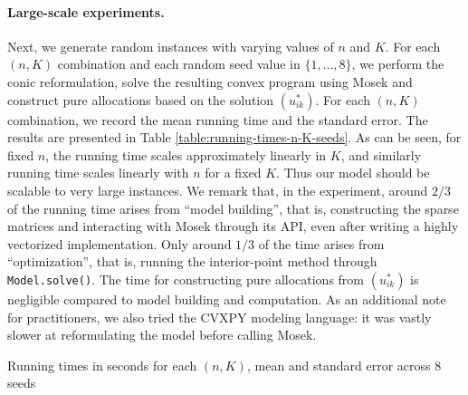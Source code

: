 \paragraph{Large-scale experiments.} 
Next, we generate random instances with varying values of $n$ and $K$.
For each $(n,K)$ combination and each random seed value in $\{ 1, \dots, 8\}$, we perform the conic reformulation, solve the resulting convex program using Mosek and construct pure allocations based on the solution $(u^*_{ik})$.
For each $(n,K)$ combination, we record the mean running time and the standard error.
The results are presented in Table \ref{table:running-times-n-K-seeds}. 
As can be seen, for fixed $n$, the running time scales approximately linearly in $K$, and similarly running time scales linearly with $n$ for a fixed $K$. Thus our model should be scalable to very large instances.
We remark that, in the experiment, around $2/3$ of the running time arises from ``model building'', that is, constructing the sparse matrices and interacting with Mosek through its API, even after writing a highly vectorized implementation. 
Only around $1/3$ of the time arises from ``optimization'', that is, running the interior-point method through \texttt{Model.solve()}. The time for constructing pure allocations from $(u^*_{ik})$ is negligible compared to model building and computation. As an additional note for practitioners, we also tried the CVXPY modeling language: it was vastly slower at reformulating the model before calling Mosek.

\begin{table}
	\begin{center}
		
		\caption{Running times in seconds for each $(n,K)$, mean and standard error across $8$ seeds} 
		\label{table:running-times-n-K-seeds}
	\end{center}
\end{table}